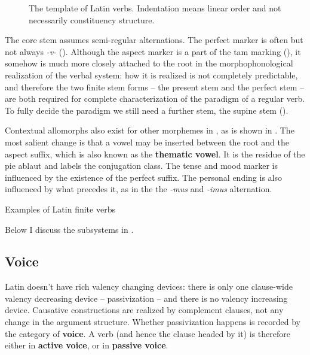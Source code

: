 \documentclass[a4paper, oneside]{report}
\newcommand*{\citepage}[1]{p.~{#1}}
\newcommand*{\concept}[1]{\textbf{#1}}
\newcommand{\corpus}[1]{\emph{#1}}
\begin{document}
\begin{figure}[H]
    \centering
    
    \caption{The template of Latin verbs.
    Indentation means linear order and not necessarily constituency structure.}
    \label{fig:latin-verb}
\end{figure}

The core stem assumes semi-regular alternations.
The perfect marker is often but not always \corpus{-v-} ().
Although the aspect marker is a part of the \acs{tam} marking
(),
it somehow is much more closely attached to the root 
in the morphophonological realization of the verbal system:
how it is realized is not completely predictable,
and therefore the two finite stem forms -- 
the present stem and the perfect stem -- 
are both required for complete characterization of the paradigm of a regular verb.
To fully decide the paradigm 
we still need a further stem, the supine stem
().

Contextual allomorphs also exist for other morphemes in 
\citep[\citepage{11}]{embick2005status},
as is shown in .
The most salient change is that 
a vowel may be inserted between the root and the aspect suffix,
which is also known as the \concept{thematic vowel}.
It is the residue of the \ac{pie} ablaut
and labels the conjugation class.
The tense and mood marker is influenced by the existence of the perfect suffix.
The personal ending is also influenced by what precedes it,
as in the the \corpus{-mus} and \corpus{-imus} alternation.

\begin{sidewaystable}
    \centering
    \caption{Examples of Latin finite verbs}
    \label{tbl:latin-finite-verbs}
        
\end{sidewaystable}

Below I discuss the subsystems in .

\subsection{Voice}

Latin doesn't have rich valency changing devices:
there is only one clause-wide valency decreasing device -- passivization -- 
and there is no valency increasing device.
Causative constructions are realized by complement clauses,
not any change in the argument structure.
Whether passivization happens is recorded by the category of \concept{voice}.
A verb (and hence the clause headed by it) is therefore either in \concept{active voice},
or in \concept{passive voice}.
\end{document}

